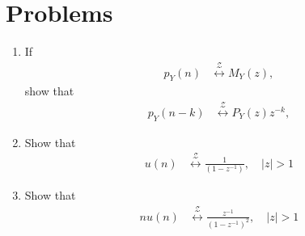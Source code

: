 \documentclass[journal,12pt,onecolumn]{IEEEtran}
\renewcommand\thesection{\arabic{section}}
\providecommand{\brak}[1]{\ensuremath{\left(#1\right)}}
\theoremstyle{remark}
\providecommand{\abs}[1]{\left\vert#1\right\vert}
\providecommand{\system}[1]{\overset{\mathcal{#1}}{ \longleftrightarrow}}
\numberwithin{equation}{section}
\begin{document}
\section{Problems}
\begin{enumerate}[label=\arabic*.,ref=\thesection.\theenumi]
\item If 
\begin{align}
p_Y(n) &\system{Z}M_Y(z), 
\end{align}
	show that
\begin{align}
p_Y(n-k) &\system{Z}P_Y(z)z^{-k},
\end{align}
\item Show that 
\begin{align}
u(n)&\system{Z} \frac{1}{\brak{1-z^{-1}}}, \quad \abs{z} > 1
\end{align}
\item Show that 
\begin{align}
nu(n)&\system{Z} \frac{z^{-1}}{\brak{1-z^{-1}}^2}, \quad \abs{z} > 1
\end{align}


\end{enumerate}
\end{document}
